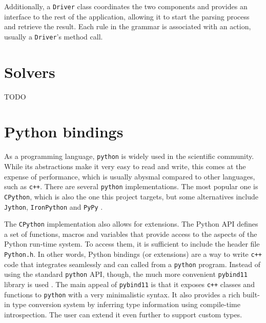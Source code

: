 Additionally, a \texttt{Driver} class coordinates the two components and provides an interface to the rest of the application, allowing it to start the parsing process and retrieve the result.
Each rule in the grammar is associated with an action, usually a \texttt{Driver}'s method call.





\section{Solvers}

TODO

\section{Python bindings}

As a programming language, \texttt{python} is widely used in the scientific community.
While its abstractions make it very easy to read and write, this comes at the expense of performance, which is usually abysmal compared to other languages, such as \texttt{c++}.
There are several \texttt{python} implementations.
The most popular one is \texttt{CPython}, which is also the one this project targets, but some alternatives include \texttt{Jython}, \texttt{IronPython} and \texttt{PyPy} \cite{man:python-implementations}.

The \texttt{CPython} implementation also allows for extensions.
The Python API defines a set of functions, macros and variables that provide access to the aspects of the Python run-time system.
To access them, it is sufficient to include the header file \texttt{Python.h}.
In other words, Python bindings (or extensions) are a way to write \texttt{c++} code that integrates seamlessly and can called from a \texttt{python} program.
Instead of using the standard \texttt{python} API, though, the much more convenient \texttt{pybind11} library is used \cite{man:pybind11}.
The main appeal of \texttt{pybind11} is that it exposes \texttt{c++} classes and functions to \texttt{python} with a very minimalistic syntax.
It also provides a rich built-in type conversion system by inferring type information using compile-time introspection.
The user can extend it even further to support custom types.

